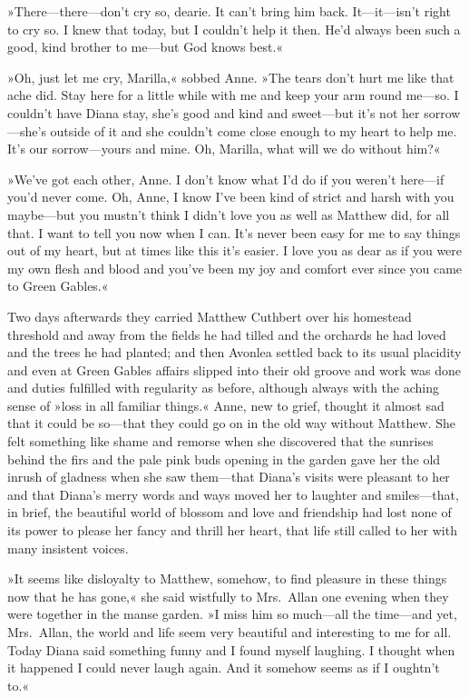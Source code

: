 »There—there—don't cry so, dearie. It can't bring him back. It—it—isn't right to cry so. I knew that today, but I couldn't help it then. He'd always been such a good, kind brother to me—but God knows best.«

»Oh, just let me cry, Marilla,« sobbed Anne. »The tears don't hurt me like that ache did. Stay here for a little while with me and keep your arm round me—so. I couldn't have Diana stay, she's good and kind and sweet—but it's not her sorrow—she's outside of it and she couldn't come close enough to my heart to help me. It's our sorrow—yours and mine. Oh, Marilla, what will we do without him?«

»We've got each other, Anne. I don't know what I'd do if you weren't here—if you'd never come. Oh, Anne, I know I've been kind of strict and harsh with you maybe—but you mustn't think I didn't love you as well as Matthew did, for all that. I want to tell you now when I can. It's never been easy for me to say things out of my heart, but at times like this it's easier. I love you as dear as if you were my own flesh and blood and you've been my joy and comfort ever since you came to Green Gables.«

Two days afterwards they carried Matthew Cuthbert over his homestead threshold and away from the fields he had tilled and the orchards he had loved and the trees he had planted; and then Avonlea settled back to its usual placidity and even at Green Gables affairs slipped into their old groove and work was done and duties fulfilled with regularity as before, although always with the aching sense of »loss in all familiar things.« Anne, new to grief, thought it almost sad that it could be so—that they could go on in the old way without Matthew. She felt something like shame and remorse when she discovered that the sunrises behind the firs and the pale pink buds opening in the garden gave her the old inrush of gladness when she saw them—that Diana's visits were pleasant to her and that Diana's merry words and ways moved her to laughter and smiles—that, in brief, the beautiful world of blossom and love and friendship had lost none of its power to please her fancy and thrill her heart, that life still called to her with many insistent voices.

»It seems like disloyalty to Matthew, somehow, to find pleasure in these things now that he has gone,« she said wistfully to Mrs.~Allan one evening when they were together in the manse garden. »I miss him so much—all the time—and yet, Mrs.~Allan, the world and life seem very beautiful and interesting to me for all. Today Diana said something funny and I found myself laughing. I thought when it happened I could never laugh again. And it somehow seems as if I oughtn't to.«

